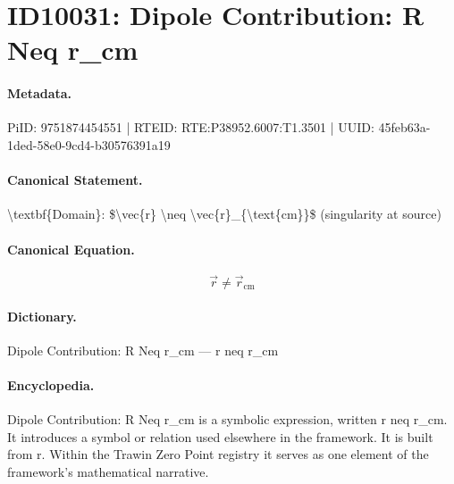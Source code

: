 \section*{ID10031: Dipole Contribution: R Neq r\_cm}
\paragraph{Metadata.}
PiID: 9751874454551 | RTEID: RTE:P38952.6007:T1.3501 | UUID: 45feb63a-1ded-58e0-9cd4-b30576391a19

\paragraph{Canonical Statement.}
\textbackslash{}textbf\{Domain\}: \$\textbackslash{}vec\{r\} \textbackslash{}neq \textbackslash{}vec\{r\}\_\{\textbackslash{}text\{cm\}\}\$ (singularity at source)

\paragraph{Canonical Equation.}
\[
\vec{r} \neq \vec{r}_{\text{cm}}
\]

\paragraph{Dictionary.}
Dipole Contribution: R Neq r\_cm — r neq r\_cm

\paragraph{Encyclopedia.}
Dipole Contribution: R Neq r\_cm is a symbolic expression, written r neq r\_cm. It introduces a symbol or relation used elsewhere in the framework. It is built from r. Within the Trawin Zero Point registry it serves as one element of the framework's mathematical narrative.

